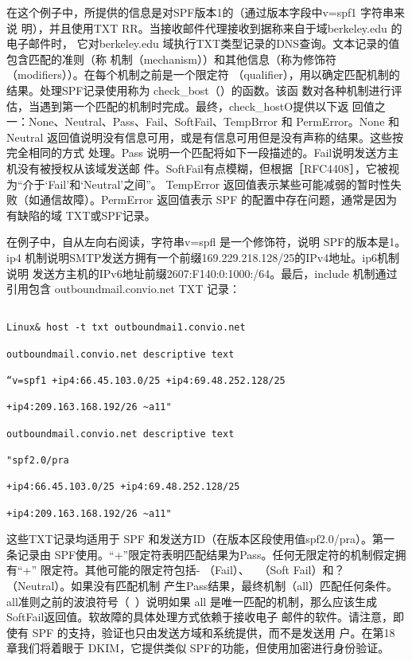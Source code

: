 在这个例子中，所提供的信息是对SPF版本1的（通过版本字段中v=spf1 字符串来说
明），并且使用TXT RR。当接收邮件代理接收到据称来自于域berkeley.edu 的电子邮件时，
它对berkeley.edu 域执行TXT类型记录的DNS查询。文本记录的值包含匹配的准则（称
机制（mechanism））和其他信息（称为修饰符（modifiers））。在每个机制之前是一个限定符
（qualifier），用以确定匹配机制的结果。处理SPF记录使用称为 check\_bost（）的函数。该函
数对各种机制进行评估，当遇到第一个匹配的机制时完成。最终，check\_hostO提供以下返
回值之一：None、Neutral、Pass、Fail、SoftFail、TempBrror 和 PermError。None 和 Neutral
返回值说明没有信息可用，或是有信息可用但是没有声称的结果。这些按完全相同的方式
处理。Pass 说明一个匹配将如下一段描述的。Fail说明发送方主机没有被授权从该域发送邮
件。SoftFail有点模糊，但根据［RFC4408］，它被视为“介于‘Fail’和‘Neutral’之间”。
TempError 返回值表示某些可能减弱的暂时性失败（如通信故障）。PermError 返回值表示
SPF 的配置中存在问题，通常是因为有缺陷的域 TXT或SPF记录。

在例子中，自从左向右阅读，字符串v=spfl 是一个修饰符，说明 SPF的版本是1。ip4
机制说明SMTP发送方拥有一个前缀169.229.218.128/25的IPv4地址。ip6机制说明
发送方主机的IPv6地址前缀2607:F140:0:1000:/64。最后，include 机制通过引用包含
outboundmail.convio.net TXT 记录：

\begin{verbatim}
    
Linux& host -t txt outboundmai1.convio.net

outboundmail.convio.net descriptive text

“v=spf1 +ip4:66.45.103.0/25 +ip4:69.48.252.128/25

+ip4:209.163.168.192/26 ~a11"

outboundmail.convio.net descriptive text

"spf2.0/pra

+ip4:66.45.103.0/25 +ip4:69.48.252.128/25

+ip4:209.163.168.192/26 ~a11"
\end{verbatim}

\begin{tcolorbox}
    这些TXT记录均适用于 SPF 和发送方ID（在版本区段使用值spf2.0/pra）。第一
    条记录由 SPF使用。“+”限定符表明匹配结果为Pass。任何无限定符的机制假定拥有“+”
    限定符。其他可能的限定符包括- （Fail）、~ （Soft Fail）和？（Neutral）。如果没有匹配机制
    产生Pass结果，最终机制（all）匹配任何条件。all准则之前的波浪符号（~）说明如果 all
    是唯一匹配的机制，那么应该生成SoftFail返回值。软故障的具体处理方式依赖于接收电子
    邮件的软件。请注意，即使有 SPF 的支持，验证也只由发送方域和系统提供，而不是发送用
    户。在第18 章我们将着眼于 DKIM，它提供类似 SPF的功能，但使用加密进行身份验证。
\end{tcolorbox}

